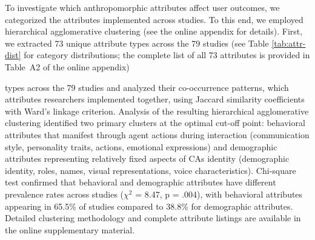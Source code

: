 \documentclass[manuscript,screen,review,anonymous]{acmart}
\DeclareRobustCommand{\change}[1]{%
    \textcolor{changeblue}{#1}%
  }
\DeclareRobustCommand{\change}[1]{#1}
\begin{document}
To investigate which anthropomorphic attributes affect user outcomes, we categorized the attributes implemented across studies. To this end, we employed hierarchical agglomerative clustering (see the online appendix for details). \change{First, we extracted 73 unique attribute types across the 79 studies (see Table \ref{tab:attr-dist} for category distributions; the complete list of all 73 attributes is provided in Table~A2 of the online appendix)}
types across the 79 studies and analyzed their co-occurrence patterns, which attributes researchers implemented together, using Jaccard similarity coefficients with Ward's linkage criterion. %
Analysis of the resulting hierarchical agglomerative clustering identified two primary clusters at the optimal cut-off point: behavioral attributes that manifest through agent actions during interaction (communication style, personality traits, actions, emotional expressions) and demographic attributes representing relatively fixed aspects of CAs identity (demographic identity, roles, names, visual representations, voice characteristics). Chi-square test confirmed that behavioral and demographic attributes have different prevalence rates across studies ($\chi^2$ = 8.47, p = .004), with behavioral attributes appearing in 65.5\% of studies compared to 38.8\% for demographic attributes. Detailed clustering methodology and complete attribute listings are available in the online supplementary material.

\end{document}
